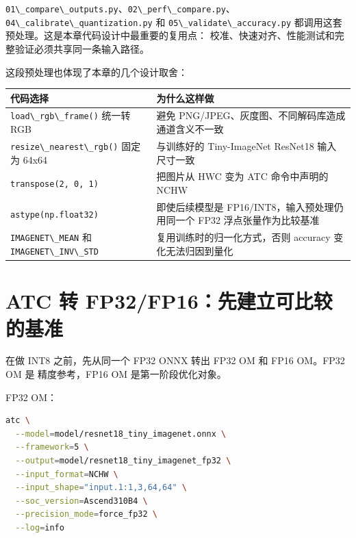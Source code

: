 \passthrough{\lstinline!01\_compare\_outputs.py!}、\passthrough{\lstinline!02\_perf\_compare.py!}、\passthrough{\lstinline!04\_calibrate\_quantization.py!}
和 \passthrough{\lstinline!05\_validate\_accuracy.py!}
都调用这套预处理。这是本章代码设计中最重要的复用点：
校准、快速对齐、性能测试和完整验证必须共享同一条输入路径。

这段预处理也体现了本章的几个设计取舍：

\begin{longtable}[]{@{}
  >{\raggedright\arraybackslash}p{}
  >{\raggedright\arraybackslash}p{}@{}}
\toprule\noalign{}
\begin{minipage}[b]{\linewidth}\raggedright
代码选择
\end{minipage} & \begin{minipage}[b]{\linewidth}\raggedright
为什么这样做
\end{minipage} \\
\midrule\noalign{}
\endhead
\bottomrule\noalign{}
\endlastfoot
\passthrough{\lstinline!load\_rgb\_frame()!} 统一转 RGB & 避免
PNG/JPEG、灰度图、不同解码库造成通道含义不一致 \\
\passthrough{\lstinline!resize\_nearest\_rgb()!} 固定为 64x64 &
与训练好的 Tiny-ImageNet ResNet18 输入尺寸一致 \\
\passthrough{\lstinline!transpose(2, 0, 1)!} & 把图片从 HWC 变为 ATC
命令中声明的 NCHW \\
\passthrough{\lstinline!astype(np.float32)!} & 即使后续模型是
FP16/INT8，输入预处理仍用同一个 FP32 浮点张量作为比较基准 \\
\passthrough{\lstinline!IMAGENET\_MEAN!} 和
\passthrough{\lstinline!IMAGENET\_INV\_STD!} &
复用训练时的归一化方式，否则 accuracy 变化无法归因到量化 \\
\end{longtable}

\section{ATC 转
FP32/FP16：先建立可比较的基准}\label{src-book-chapter9-h6}

在做 INT8 之前，先从同一个 FP32 ONNX 转出 FP32 OM 和 FP16 OM。FP32 OM 是
精度参考，FP16 OM 是第一阶段优化对象。

FP32 OM：

\begin{lstlisting}[language=bash]
atc \
  --model=model/resnet18_tiny_imagenet.onnx \
  --framework=5 \
  --output=model/resnet18_tiny_imagenet_fp32 \
  --input_format=NCHW \
  --input_shape="input.1:1,3,64,64" \
  --soc_version=Ascend310B4 \
  --precision_mode=force_fp32 \
  --log=info
\end{lstlisting}


